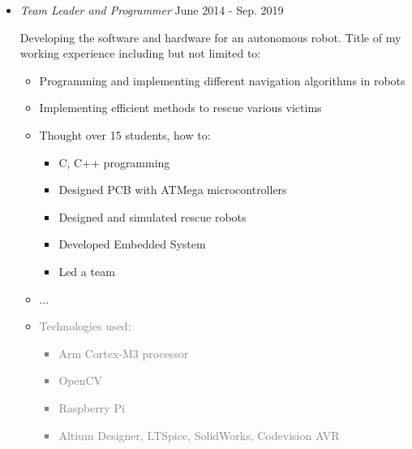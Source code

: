 \documentclass[10pt,a4paper,sans]{moderncv} %
\begin{document}
    \begin{itemize}
		\item {} \emph{Team Leader and Programmer }  \hfill June 2014 - Sep. 2019

        Developing the software and hardware for an autonomous robot. Title of my working experience including but not limited to:
		\begin{itemize}
			\item Programming and implementing different navigation algorithms in robots
			\item Implementing efficient methods to rescue various victims
			\item Thought over 15 students, how to:
			\begin{itemize}
				\item C, C++ programming
				\item Designed PCB with ATMega microcontrollers
                \item Designed and simulated rescue robots
				\item Developed Embedded System
				\item Led a team
			\end{itemize}
            \item ...
            \item \textcolor{gray}{ Technologies used:
            \begin{itemize}
				\item Arm Cortex-M3 processor
				\item OpenCV
				\item Raspberry Pi
				\item Altium Designer, LTSpice, SolidWorks, Codevision AVR
			\end{itemize} }
		\end{itemize}
	\end{itemize}

\end{document}
